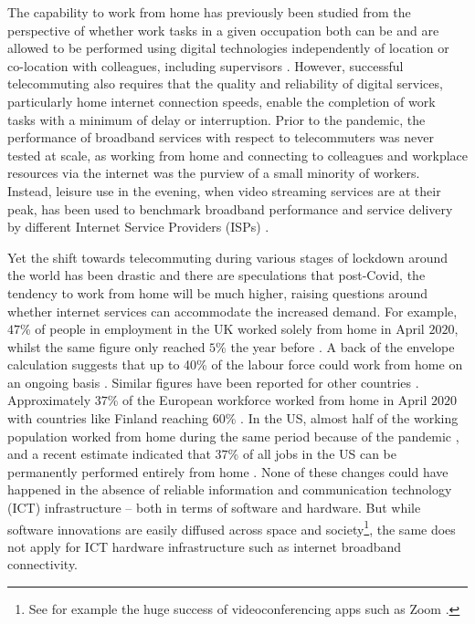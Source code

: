 \documentclass[Royal,times,sageh]{sagej}
\begin{document}
The capability to work from home has previously been studied from the
perspective of whether work tasks in a given occupation both can be and
are allowed to be performed using digital technologies independently of
location or co-location with colleagues, including supervisors
\citep{allen2015effective, singh2013modeling}. However, successful
telecommuting also requires that the quality and reliability of digital
services, particularly home internet connection speeds, enable the
completion of work tasks with a minimum of delay or interruption. Prior
to the pandemic, the performance of broadband services with respect to
telecommuters was never tested at scale, as working from home and
connecting to colleagues and workplace resources via the internet was
the purview of a small minority of workers. Instead, leisure use in the
evening, when video streaming services are at their peak, has been used
to benchmark broadband performance and service delivery by different
Internet Service Providers (ISPs) \citep{ofcom2017}.

Yet the shift towards telecommuting during various stages of lockdown
around the world has been drastic and there are speculations that
post-Covid, the tendency to work from home will be much higher, raising
questions around whether internet services can accommodate the increased
demand. For example, \(47\)\% of people in employment in the UK worked
solely from home in April \(2020\), whilst the same figure only reached
\(5\)\% the year before \citep{ons2020, ons2020lm2019}. A back of the
envelope calculation suggests that up to 40\% of the labour force could
work from home on an ongoing basis \citep{batty2020editorial}. Similar
figures have been reported for other countries
\citep{felstead2020homeworking}. Approximately \(37\)\% of the European
workforce worked from home in April \(2020\) with countries like Finland
reaching \(60\)\% \citep{eurofound2020}. In the US, almost half of the
working population worked from home during the same period because of
the pandemic \citep{brynjolfsson2020covid}, and a recent estimate
indicated that \(37\)\% of all jobs in the US can be permanently
performed entirely from home \citep{NBERw26948}. None of these changes
could have happened in the absence of reliable information and
communication technology (ICT) infrastructure -- both in terms of
software and hardware. But while software innovations are easily
diffused across space and society\footnote{See for example the huge
  success of videoconferencing apps such as Zoom \citep{marks2020zoom}.},
the same does not apply for ICT hardware infrastructure such as internet
broadband connectivity.
\end{document}
